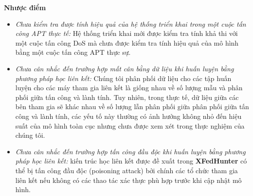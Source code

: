 \bigbreak\noindent
\textbf{Nhược điểm}
\begin{itemize}


    \item \textit{Chưa kiểm tra được tính hiệu quả của hệ thống triển khai trong một cuộc tấn công APT thực tế:} Hệ thống triển khai mới được kiểm tra tính khả thi với một cuộc tấn công DoS mà chưa được kiểm tra tính hiệu quả của mô hình bằng một cuộc tấn công APT thực sự.

    \item \textit{Chưa cân nhắc đến trường hợp mất cân bằng dữ liệu khi huấn luyện bằng phương pháp học liên kết:} Chúng tôi phân phối dữ liệu cho các tập huấn luyện cho các máy tham gia liên kết là giống nhau về số lượng mẫu và phân phối giữa tấn công và lành tính. Tuy nhiên, trong thực tế, dữ liệu giữa các bên tham gia sẽ khác nhau về số lượng lẫn phân phối giữa phân phối giữa tấn công và lành tính, các yếu tố này thường có ảnh hưởng không nhỏ đến hiệu suất của mô hình toàn cục nhưng chưa được xem xét trong thực nghiệm của chúng tôi.

    \item \textit{Chưa cân nhắc đến trường hợp tấn công đầu độc khi huấn luyện bằng phương pháp học liên kết:} kiến trúc học liên kết được đề xuất trong \textbf{XFedHunter} có thể bị tấn công đầu độc (poisoning attack) bởi chính các tổ chức tham gia liên kết nếu không có các thao tác xác thực phù hợp trước khi cập nhật mô hình.
\end{itemize}
